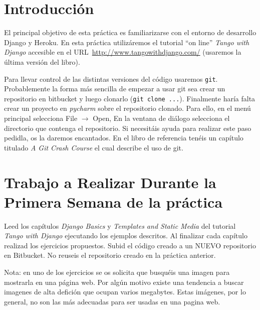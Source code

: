 \documentclass[12pt]{article} %
\begin{document}

\tableofcontents %

\newpage %


\section {Introducción}
El principal objetivo de esta práctica es familiarizarse con el entorno de desarrollo Django y Heroku. En esta práctica utilizáremos el tutorial ``on line'' \textit{Tango with Django} accesible en el URL~\url{http://www.tangowithdjango.com/} (usaremos la última versión del libro). 

Para llevar control de las distintas versiones del código usaremos \texttt{git}. Probablemente la forma más sencilla de empezar a usar git sea crear un repositorio en bitbucket y luego clonarlo (\texttt{git clone ...}). Finalmente haría falta crear un proyecto en \textit{pycharm} sobre el repositorio clonado. Para ello, en el menú principal selecciona File $\rightarrow$ Open, En la ventana de diálogo selecciona el directorio que contenga el repositorio.
Si necesitáis ayuda para realizar este paso pedidla, os la daremos encantados. En el libro de referencia
tenéis un capítulo titulado \textit{A Git Crash Course} el cual describe el uso de git. 

\section{Trabajo a Realizar Durante la Primera Semana de la práctica}

Leed los capítulos \textit{Django Basics} y \textit{Templates and Static Media} del tutorial  \textit{Tango with Django} ejecutando los ejemplos descritos. Al finalizar cada capítulo  realizad los
ejercicios propuestos. Subid el código creado a un NUEVO repositorio en Bitbucket. No reuseis el repositorio creado en la práctica anterior.


Nota: en uno de los ejercicios se os solicita que busquéis una imagen para mostrarla en una página web.  Por algún motivo existe una tendencia a buscar imagenes de alta defición que ocupan varios megabytes. Estas imágenes, por lo general, no son las más adecuadas para ser usadas en una pagina web.
\end{document}
